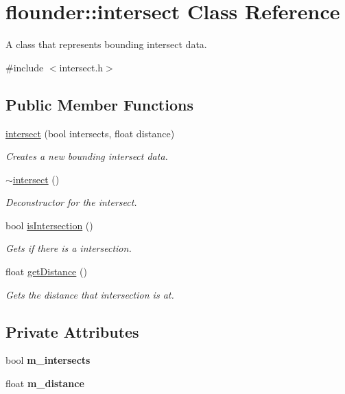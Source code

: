 \hypertarget{classflounder_1_1intersect}{}\section{flounder\+:\+:intersect Class Reference}
\label{classflounder_1_1intersect}


A class that represents bounding intersect data.  




{\ttfamily \#include $<$intersect.\+h$>$}

\subsection*{Public Member Functions}
\begin{DoxyCompactItemize}
\item 
\hyperlink{classflounder_1_1intersect_a2c5914ddf56d123d8850fbfdba24d414}{intersect} (bool intersects, float distance)
\begin{DoxyCompactList}\small\item\em Creates a new bounding intersect data. \end{DoxyCompactList}\item 
\hyperlink{classflounder_1_1intersect_a9e7a429dfedbb9977ee512a3804eea94}{$\sim$intersect} ()
\begin{DoxyCompactList}\small\item\em Deconstructor for the intersect. \end{DoxyCompactList}\item 
bool \hyperlink{classflounder_1_1intersect_a680386b9684782d4b115ca380068ff3e}{is\+Intersection} ()
\begin{DoxyCompactList}\small\item\em Gets if there is a intersection. \end{DoxyCompactList}\item 
float \hyperlink{classflounder_1_1intersect_ab3f00d53d2614603bda044a43b27d679}{get\+Distance} ()
\begin{DoxyCompactList}\small\item\em Gets the distance that intersection is at. \end{DoxyCompactList}\end{DoxyCompactItemize}
\subsection*{Private Attributes}
\begin{DoxyCompactItemize}
\item 
\mbox{\label{classflounder_1_1intersect_a897e4a28f81d86a82855f5a71de3dcbc}} 
bool {\bfseries m\+\_\+intersects}
\item 
\mbox{\label{classflounder_1_1intersect_abc36819adc7f0d5687b6b78995bb5e71}} 
float {\bfseries m\+\_\+distance}
\end{DoxyCompactItemize}


